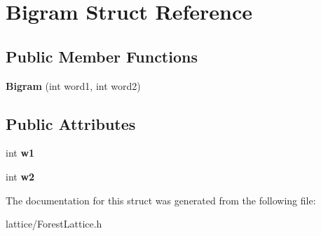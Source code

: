 \hypertarget{structBigram}{
\section{Bigram Struct Reference}
\label{structBigram}
}
\subsection*{Public Member Functions}
\begin{DoxyCompactItemize}
\item 
\hypertarget{structBigram_a020c686282bd0fb8d36bb1599c6b1a14}{
{\bfseries Bigram} (int word1, int word2)}
\label{structBigram_a020c686282bd0fb8d36bb1599c6b1a14}

\end{DoxyCompactItemize}
\subsection*{Public Attributes}
\begin{DoxyCompactItemize}
\item 
\hypertarget{structBigram_a27e17775db4f1239992f52ca5946c42b}{
int {\bfseries w1}}
\label{structBigram_a27e17775db4f1239992f52ca5946c42b}

\item 
\hypertarget{structBigram_a0dfa6c244c9d3a4730c1338e94b1723b}{
int {\bfseries w2}}
\label{structBigram_a0dfa6c244c9d3a4730c1338e94b1723b}

\end{DoxyCompactItemize}


The documentation for this struct was generated from the following file:\begin{DoxyCompactItemize}
\item 
lattice/ForestLattice.h\end{DoxyCompactItemize}
